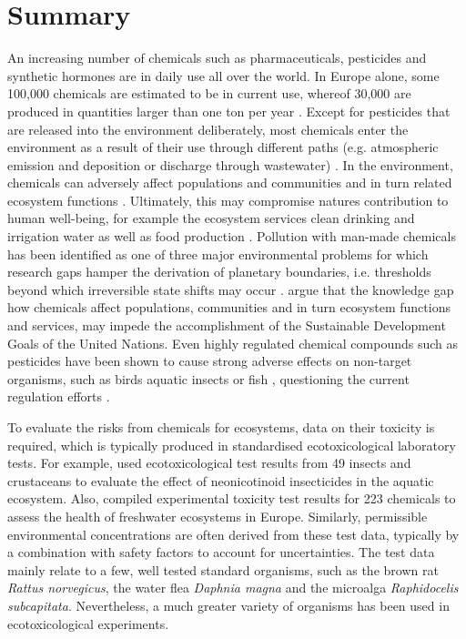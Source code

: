 \section{Summary}
An increasing number of chemicals such as pharmaceuticals, pesticides and synthetic hormones are in daily use all over the world. In Europe alone, some 100,000 chemicals are estimated to be in current use, whereof 30,000 are produced in quantities larger than one ton per year \citep{breithaupt_costs_2006}. Except for pesticides that are released into the environment deliberately, most chemicals enter the environment as a result of their use through different paths (e.g. atmospheric emission and deposition or discharge through wastewater) \citep{schwarzenbach_challenge_2006}. In the environment, chemicals can adversely affect populations and communities and in turn related ecosystem functions \citep{schafer_thresholds_2012, malaj_organic_2014, hallmann_declines_2014, barracaracciolo_pharmaceuticals_2015, johnston_review_2015}. Ultimately, this may compromise natures contribution to human well-being, for example the ecosystem services clean drinking and irrigation water as well as food production \citep{peters_review_2013, vandersluijs_neonicotinoids_2013, yamamuro_neonicotinoids_2019}. 
Pollution with man-made chemicals has been identified as one of three major environmental problems for which research gaps hamper the derivation of planetary boundaries, i.e. thresholds beyond which irreversible state shifts may occur \citep{steffen_anthropocene_2007, steffen_planetary_2015}. \citet{bernhardt_synthetic_2017} argue that the knowledge gap how chemicals affect populations, communities and in turn ecosystem functions and services, may impede the accomplishment of the Sustainable Development Goals \citep{rosa_transforming_2017} of the United Nations. Even highly regulated chemical compounds such as pesticides have been shown to cause strong adverse effects on non-target organisms, such as birds \citep{hallmann_declines_2014} aquatic insects \citep{beketov_pesticides_2013} or fish \citep{yamamuro_neonicotinoids_2019}, questioning the current regulation efforts \citep{schafer_future_2019}.

To evaluate the risks from chemicals for ecosystems, data on their toxicity is required, which is typically produced in standardised ecotoxicological laboratory tests. For example, \citet{morrissey_neonicotinoid_2015} used ecotoxicological test results from 49 insects and crustaceans to evaluate the effect of neonicotinoid insecticides in the aquatic ecosystem. Also, \citet{malaj_organic_2014} compiled experimental toxicity test results for 223 chemicals to assess the health of freshwater ecosystems in Europe. Similarly, permissible environmental concentrations are often derived from these test data, typically by a combination with safety factors to account for uncertainties. The test data mainly relate to a few, well tested standard organisms, such as the brown rat \textit{Rattus norvegicus}, the water flea \textit{Daphnia magna} and the microalga \textit{Raphidocelis subcapitata}. Nevertheless, a much greater variety of organisms has been used in ecotoxicological experiments.

